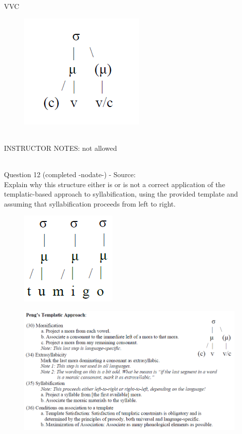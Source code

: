 \documentclass[12pt]{article}
\begin{document}
VVC

\begin{figure}[H]
\includegraphics{../images/ponapean_syllabletemplate.png}
\end{figure}

~\\
INSTRUCTOR NOTES: not allowed


~\\

{\large Question 12} (completed -nodate-) - Source: \\

Explain why this structure either is or is not a correct application of the templatic-based approach to syllabification, using the provided template and assuming that syllabification proceeds from left to right.\\

\begin{figure}[H]
\includegraphics{../images/pengtemplate_tumigo_yes.png}
\end{figure}
\begin{figure}[H]
\includegraphics{../images/peng_template_withdiagram.png}
\end{figure}
\end{document}
